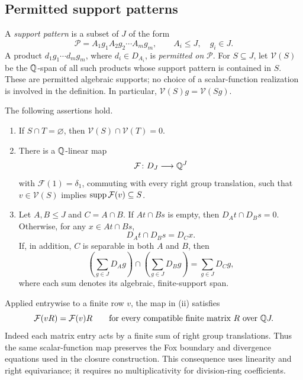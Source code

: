 \subsection{Permitted support patterns}

A \emph{support pattern} is a subset of \(J\) of the form
\[
 \mathcal P=A_1g_1A_2g_2\cdots A_mg_m,
 \qquad A_i\le J,\quad g_i\in J.
\]
A product \(d_1g_1\cdots d_mg_m\), where \(d_i\in D_{A_i}\), is
\emph{permitted on} \(\mathcal P\). For \(S\subseteq J\), let
\(\mathcal V(S)\) be the \(\mathbb Q\)-span of all such products whose
support pattern is contained in \(S\). These are permitted algebraic
supports; no choice of a scalar-function realization is involved in the
definition. In particular,
\(\mathcal V(S)g=\mathcal V(Sg)\).

\begin{theorem}\label{coeff:support}
The following assertions hold.
\begin{enumerate}[label=\textup{(\roman*)}]
\item If \(S\cap T=\varnothing\), then
\(\mathcal V(S)\cap\mathcal V(T)=0\).
\item There is a \(\mathbb Q\)-linear map
\[
 \mathcal F\colon D_J\longrightarrow\mathbb Q^J
\]
with \(\mathcal F(1)=\delta_1\), commuting with every right group
translation, such that
\(v\in\mathcal V(S)\) implies
\(\operatorname{supp}\mathcal F(v)\subseteq S\).
\item Let \(A,B\le J\) and \(C=A\cap B\). If \(At\cap Bs\) is empty,
then \(D_A t\cap D_B s=0\). Otherwise, for any \(x\in At\cap Bs\),
\begin{equation}\label{coeff:single-coset}
 D_A t\cap D_B s=D_Cx.
\end{equation}
If, in addition, \(C\) is separable in both \(A\) and \(B\), then
\begin{equation}\label{coeff:finite-span}
 \left(\sum_{g\in J}D_Ag\right)
 \cap
 \left(\sum_{g\in J}D_Bg\right)
 =\sum_{g\in J}D_Cg,
\end{equation}
where each sum denotes its algebraic, finite-support span.
\end{enumerate}
\end{theorem}

Applied entrywise to a finite row \(v\), the map in (ii) satisfies
\[
 \mathcal F(vR)=\mathcal F(v)R
 \qquad\text{for every compatible finite matrix }R\text{ over }\mathbb Q J.
\]
Indeed each matrix entry acts by a finite sum of right group
translations. Thus the same scalar-function map preserves the Fox
boundary and divergence equations used in the closure construction.
This consequence uses linearity and right equivariance; it requires
no multiplicativity for division-ring coefficients.

